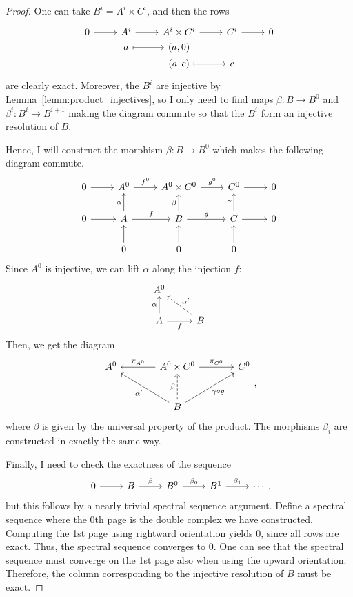 \begin{proof}
  One can take $B^{i}=A^{i}\times C^{i}$, and then the rows
  \[\begin{tikzcd}[row sep=0]
      0\rar & A^{i}\rar & A^{i}\times C^{i}\rar & C^{i}\rar & 0 \\
      & a\rar[mapsto] & (a, 0) && \\
      && (a, c)\rar[mapsto] & c &
    \end{tikzcd}\]
  are clearly exact. Moreover, the $B^{i}$ are injective by
  Lemma~\ref{lemm:product_injectives}, so I only need to find maps
  $\beta:B\to B^{0}$ and $\beta^{i}:B^{i}\to B^{i+1}$ making the diagram
  commute so that the $B^{i}$ form an injective resolution of $B$.

  Hence, I will construct the morphism $\beta:B\to B^{0}$ which makes the following diagram commute.
  \[\begin{tikzcd}
      0\rar & A^{0}\rar{f^{0}} & A^{0}\times C^{0}\rar{g^{0}} & C^{0}\rar & 0 \\
      0\rar & A\rar{f}\uar{\alpha} & B\rar{g}\uar{\beta}
      & C\rar\uar{\gamma} & 0 \\ & 0\uar & 0\uar & 0\uar &
    \end{tikzcd}\]
  Since $A^{0}$ is injective, we can lift $\alpha$ along the injection $f$:
  \[\begin{tikzcd}
      A^{0} & \\ A\arrow[r, "f"']\uar{\alpha}
      & B\arrow[ul, dashed, "\alpha^{\prime}"']
    \end{tikzcd}\]
  Then, we get the diagram
  \[\begin{tikzcd}[row sep=large, column sep=large]
      A^{0} & A^{0}\times C^{0}\arrow[l, "\pi_{A^{0}}"']\rar{\pi_{C^{0}}}
      & C^{0} \\ & B\ular{\alpha^{\prime}}\uar[dashed]{\beta}
      \arrow[ur, "\gamma\circ g"']
    \end{tikzcd},\]
  where $\beta$ is given by the universal property of the product.
  The morphisms $\beta_{i}$ are constructed in exactly the same way.

  Finally, I need to check the exactness of the sequence
  \[\begin{tikzcd}
      0\rar & B\rar{\beta} & B^{0}\rar{\beta_{0}} & B^{1}\rar{\beta_{1}} & \cdots
    \end{tikzcd},\]
  but this follows by a nearly trivial spectral sequence argument.
  Define a spectral sequence where the 0th page is the double complex we have
  constructed. Computing the 1st page using rightward orientation yields 0,
  since all rows are exact. Thus, the spectral sequence converges to 0.
  One can see that the spectral sequence must converge on the 1st page
  also when using the upward orientation. Therefore, the column corresponding
  to the injective resolution of $B$ must be exact.
\end{proof}
